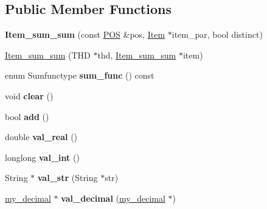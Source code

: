 \subsection*{Public Member Functions}
\begin{DoxyCompactItemize}
\item 
\mbox{\label{classItem__sum__sum_a511cae4edcbd7a77bfed055527cd630e}} 
{\bfseries Item\+\_\+sum\+\_\+sum} (const \mbox{\hyperlink{structYYLTYPE}{P\+OS}} \&pos, \mbox{\hyperlink{classItem}{Item}} $\ast$item\+\_\+par, bool distinct)
\item 
\mbox{\hyperlink{classItem__sum__sum_af259b3fb68c269dba5d29d7f1e2323eb}{Item\+\_\+sum\+\_\+sum}} (T\+HD $\ast$thd, \mbox{\hyperlink{classItem__sum__sum}{Item\+\_\+sum\+\_\+sum}} $\ast$item)
\item 
\mbox{\label{classItem__sum__sum_a11b29e6b063040ac0b7242db1208b811}} 
enum Sumfunctype {\bfseries sum\+\_\+func} () const
\item 
\mbox{\label{classItem__sum__sum_a3f0dba4f48f3f83a5d250338c8fd4e97}} 
void {\bfseries clear} ()
\item 
\mbox{\label{classItem__sum__sum_a5e8425dd393538f74e9e280143035574}} 
bool {\bfseries add} ()
\item 
\mbox{\label{classItem__sum__sum_acbf98fa4fcce777e23694e32db14ff55}} 
double {\bfseries val\+\_\+real} ()
\item 
\mbox{\label{classItem__sum__sum_a4ffab0b21aadcccc8087c67842b8daec}} 
longlong {\bfseries val\+\_\+int} ()
\item 
\mbox{\label{classItem__sum__sum_aa0b7f25e244432cf12cfd9f65b2c95cd}} 
String $\ast$ {\bfseries val\+\_\+str} (String $\ast$str)
\item 
\mbox{\label{classItem__sum__sum_acce69eac48060413528fbddac31924ab}} 
\mbox{\hyperlink{classmy__decimal}{my\+\_\+decimal}} $\ast$ {\bfseries val\+\_\+decimal} (\mbox{\hyperlink{classmy__decimal}{my\+\_\+decimal}} $\ast$)
\item 
\mbox{\label{classItem__sum__sum_ae968675e411aa456b486362fde572ec5}} 

\end{DoxyCompactItemize}
